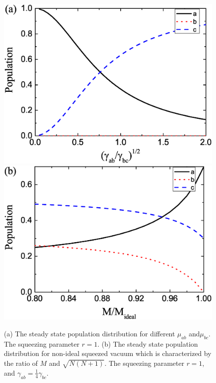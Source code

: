 \documentclass[aps,showpacs,twocolumn,twoside,groupedaddress]{revtex4}
\begin{document}
\begin{figure}
\includegraphics[width=0.9\columnwidth]{pop1.eps}
\includegraphics[width=0.9\columnwidth]{pop2.eps}
\caption{(a) The steady state population distribution for different $\mu_{ab}$ and$\mu_{bc}$. The squeezing parameter $r=1$. (b) The steady state population distribution for non-ideal squeezed vacuum which is characterized by the ratio of $M$ and $\sqrt{N(N+1)}$.  The squeezing parameter $r=1$, and $\gamma_{ab}=\frac{1}{4}\gamma_{bc}$.}
\label{2}
\end{figure}
\end{document}
